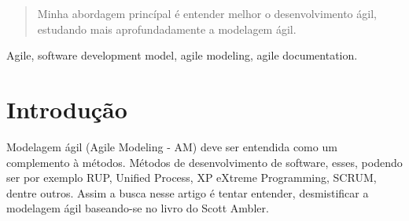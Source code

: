 \documentclass[conference]{IEEEtran}
\begin{document}
% 




\maketitle

\begin{abstract}
Minha abordagem princípal é entender melhor o desenvolvimento ágil, estudando mais aprofundadamente a modelagem ágil.
\end{abstract}
\IEEEoverridecommandlockouts
\begin{keywords}
Agile, software development model, agile modeling, agile documentation.
\end{keywords}

%
\IEEEpeerreviewmaketitle


\section{Introdução}
Modelagem ágil (Agile Modeling - AM) deve ser entendida como um complemento à métodos. Métodos de desenvolvimento de software, esses, podendo ser por exemplo RUP, Unified Process, XP eXtreme Programming, SCRUM, dentre outros. Assim a busca nesse artigo é tentar entender, desmistificar a modelagem ágil baseando-se no livro do Scott Ambler\cite{scott}.
\end{document}
